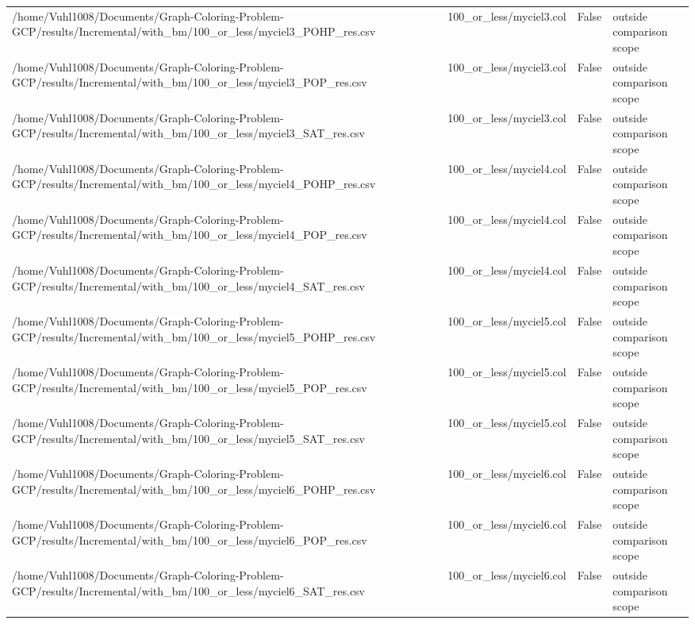 \begin{table}[htbp]
\begin{tabular}{llll}
/home/Vuhl1008/Documents/Graph-Coloring-Problem-GCP/results/Incremental/with\_bm/100\_or\_less/myciel3\_POHP\_res.csv & 100\_or\_less/myciel3.col & False & outside comparison scope \\
/home/Vuhl1008/Documents/Graph-Coloring-Problem-GCP/results/Incremental/with\_bm/100\_or\_less/myciel3\_POP\_res.csv & 100\_or\_less/myciel3.col & False & outside comparison scope \\
/home/Vuhl1008/Documents/Graph-Coloring-Problem-GCP/results/Incremental/with\_bm/100\_or\_less/myciel3\_SAT\_res.csv & 100\_or\_less/myciel3.col & False & outside comparison scope \\
/home/Vuhl1008/Documents/Graph-Coloring-Problem-GCP/results/Incremental/with\_bm/100\_or\_less/myciel4\_POHP\_res.csv & 100\_or\_less/myciel4.col & False & outside comparison scope \\
/home/Vuhl1008/Documents/Graph-Coloring-Problem-GCP/results/Incremental/with\_bm/100\_or\_less/myciel4\_POP\_res.csv & 100\_or\_less/myciel4.col & False & outside comparison scope \\
/home/Vuhl1008/Documents/Graph-Coloring-Problem-GCP/results/Incremental/with\_bm/100\_or\_less/myciel4\_SAT\_res.csv & 100\_or\_less/myciel4.col & False & outside comparison scope \\
/home/Vuhl1008/Documents/Graph-Coloring-Problem-GCP/results/Incremental/with\_bm/100\_or\_less/myciel5\_POHP\_res.csv & 100\_or\_less/myciel5.col & False & outside comparison scope \\
/home/Vuhl1008/Documents/Graph-Coloring-Problem-GCP/results/Incremental/with\_bm/100\_or\_less/myciel5\_POP\_res.csv & 100\_or\_less/myciel5.col & False & outside comparison scope \\
/home/Vuhl1008/Documents/Graph-Coloring-Problem-GCP/results/Incremental/with\_bm/100\_or\_less/myciel5\_SAT\_res.csv & 100\_or\_less/myciel5.col & False & outside comparison scope \\
/home/Vuhl1008/Documents/Graph-Coloring-Problem-GCP/results/Incremental/with\_bm/100\_or\_less/myciel6\_POHP\_res.csv & 100\_or\_less/myciel6.col & False & outside comparison scope \\
/home/Vuhl1008/Documents/Graph-Coloring-Problem-GCP/results/Incremental/with\_bm/100\_or\_less/myciel6\_POP\_res.csv & 100\_or\_less/myciel6.col & False & outside comparison scope \\
/home/Vuhl1008/Documents/Graph-Coloring-Problem-GCP/results/Incremental/with\_bm/100\_or\_less/myciel6\_SAT\_res.csv & 100\_or\_less/myciel6.col & False & outside comparison scope \\

\end{tabular}
\end{table}
